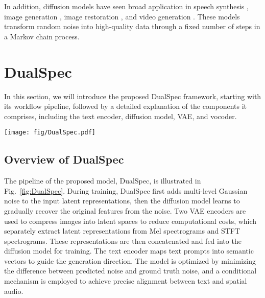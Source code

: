 \documentclass{IEEEtran}
\begin{document}
In addition, diffusion models \cite{ho2020denoising, Song2021} have seen broad application in speech synthesis \cite{chen2020wavegrad, kong2020diffwave, leng2022binauralgrad}, image generation \cite{zhang2024mmginpainting, saharia2022photorealistic, xu2024sgdm}, image restoration \cite{huang2024wavedm}, and video generation \cite{liu2023conditional,zhao2024ta2v}. These models transform random noise into high-quality data through a fixed number of steps in a Markov chain process.



\section{DualSpec}
\label{sec:DualSpec}
In this section, we will introduce the proposed DualSpec framework, starting with its workflow pipeline, followed by a detailed explanation of the components it comprises, including the text encoder, diffusion model, VAE, and vocoder.


\begin{figure*}[t]
    \centering
    \texttt{[image: fig/DualSpec.pdf]}
    \caption{{The pipeline of DualSpec. Solid and dashed lines represent the training phase and inference phase, respectively. ``CA-Down'' and  ``CA-Up'' are the abbreviations for the cross-attention downsampling block and cross-attention upsampling block, respectively. The words ``Down'' and ``Up'' are the abbreviations for the downsampling block and upsampling block, respectively. ``CA-Mid'' is short for the cross-attention mid block.}}
    \label{fig:DualSpec}
\end{figure*}

\subsection{Overview of DualSpec}

The pipeline of the proposed model, DualSpec, is illustrated in Fig.~\ref{fig:DualSpec}. During training, DualSpec first adds multi-level Gaussian noise to the input latent representations, then the diffusion model learns to gradually recover the original features from the noise. Two VAE encoders are used to compress images into latent spaces to reduce computational costs, which separately extract latent representations from Mel spectrograms and STFT spectrograms. These representations are then concatenated and fed into the diffusion model for training. The text encoder maps text prompts into semantic vectors to guide the generation direction. The model is optimized by minimizing the difference between predicted noise and ground truth noise, and a conditional mechanism is employed to achieve precise alignment between text and spatial audio.
\end{document}
